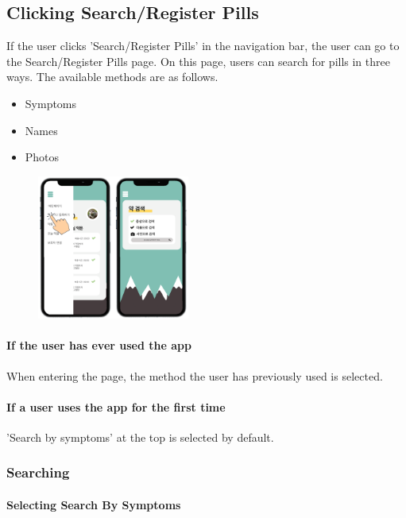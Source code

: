 \documentclass[conference]{IEEEtran}
\begin{document}
\subsection{Clicking Search/Register Pills}
If the user clicks 'Search/Register Pills' in the navigation bar, the user can go to the Search/Register Pills page. On this page, users can search for pills in three ways. The available methods are as follows.\\

\begin{itemize}
  \item Symptoms
  \item Names
  \item Photos\\
\end{itemize}

\begin{figure}[h!]
\centering
\includegraphics[width=5cm]{final_image_folder/click_search.png}
\caption{}
\label{fig:map}
\end{figure}

\paragraph{If the user has ever used the app}
When entering the page, the method the user has previously used is selected. \\

\paragraph{If a user uses the app for the first time}
'Search by symptoms' at the top is selected by default.\\

\subsubsection{Searching}

\paragraph{Selecting Search By Symptoms}
\end{document}
